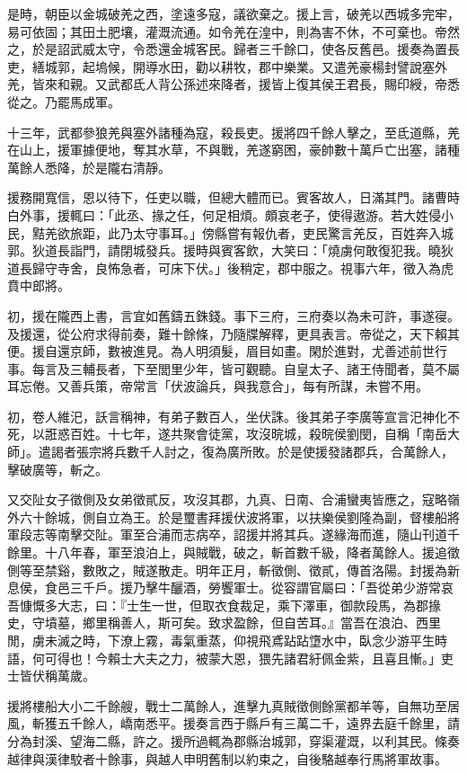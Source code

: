 \begin{pinyinscope}
是時，朝臣以金城破羌之西，塗遠多寇，議欲棄之。援上言，破羌以西城多完牢，易可依固；其田土肥壤，灌溉流通。如令羌在湟中，則為害不休，不可棄也。帝然之，於是詔武威太守，令悉還金城客民。歸者三千餘口，使各反舊邑。援奏為置長吏，繕城郭，起塢候，開導水田，勸以耕牧，郡中樂業。又遣羌豪楊封譬說塞外羌，皆來和親。又武都氐人背公孫述來降者，援皆上復其侯王君長，賜印綬，帝悉從之。乃罷馬成軍。

十三年，武都參狼羌與塞外諸種為寇，殺長吏。援將四千餘人擊之，至氐道縣，羌在山上，援軍據便地，奪其水草，不與戰，羌遂窮困，豪帥數十萬戶亡出塞，諸種萬餘人悉降，於是隴右清靜。

援務開寬信，恩以待下，任吏以職，但總大體而已。賓客故人，日滿其門。諸曹時白外事，援輒曰：「此丞、掾之任，何足相煩。頗哀老子，使得遨游。若大姓侵小民，黠羌欲旅距，此乃太守事耳。」傍縣嘗有報仇者，吏民驚言羌反，百姓奔入城郭。狄道長詣門，請閉城發兵。援時與賓客飲，大笑曰：「燒虜何敢復犯我。曉狄道長歸守寺舍，良怖急者，可床下伏。」後稍定，郡中服之。視事六年，徵入為虎賁中郎將。

初，援在隴西上書，言宜如舊鑄五銖錢。事下三府，三府奏以為未可許，事遂寑。及援還，從公府求得前奏，難十餘條，乃隨牒解釋，更具表言。帝從之，天下賴其便。援自還京師，數被進見。為人明須髮，眉目如畫。閑於進對，尤善述前世行事。每言及三輔長者，下至閭里少年，皆可觀聽。自皇太子、諸王侍聞者，莫不屬耳忘倦。又善兵策，帝常言「伏波論兵，與我意合」，每有所謀，未嘗不用。

初，卷人維汜，訞言稱神，有弟子數百人，坐伏誅。後其弟子李廣等宣言汜神化不死，以誑惑百姓。十七年，遂共聚會徒黨，攻沒晥城，殺晥侯劉閔，自稱「南岳大師」。遣謁者張宗將兵數千人討之，復為廣所敗。於是使援發諸郡兵，合萬餘人，擊破廣等，斬之。

又交阯女子徵側及女弟徵貳反，攻沒其郡，九真、日南、合浦蠻夷皆應之，寇略嶺外六十餘城，側自立為王。於是璽書拜援伏波將軍，以扶樂侯劉隆為副，督樓船將軍段志等南擊交阯。軍至合浦而志病卒，詔援并將其兵。遂緣海而進，隨山刊道千餘里。十八年春，軍至浪泊上，與賊戰，破之，斬首數千級，降者萬餘人。援追徵側等至禁谿，數敗之，賊遂散走。明年正月，斬徵側、徵貳，傳首洛陽。封援為新息侯，食邑三千戶。援乃擊牛釃酒，勞饗軍士。從容謂官屬曰：「吾從弟少游常哀吾慷慨多大志，曰：『士生一世，但取衣食裁足，乘下澤車，御款段馬，為郡掾史，守墳墓，鄉里稱善人，斯可矣。致求盈餘，但自苦耳。』當吾在浪泊、西里閒，虜未滅之時，下潦上霧，毒氣重蒸，仰視飛鳶跕跕墯水中，臥念少游平生時語，何可得也！今賴士大夫之力，被蒙大恩，猥先諸君紆佩金紫，且喜且慚。」吏士皆伏稱萬歲。

援將樓船大小二千餘艘，戰士二萬餘人，進擊九真賊徵側餘黨都羊等，自無功至居風，斬獲五千餘人，嶠南悉平。援奏言西于縣戶有三萬二千，遠界去庭千餘里，請分為封溪、望海二縣，許之。援所過輒為郡縣治城郭，穿渠灌溉，以利其民。條奏越律與漢律駮者十餘事，與越人申明舊制以約束之，自後駱越奉行馬將軍故事。


\end{pinyinscope}
